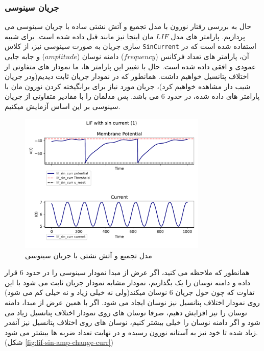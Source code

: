 \documentclass{article}
\begin{document}
            \subsubsection{جریان سینوسی}
                حال به بررسی رفتار نورون با مدل تجمیع و آتش نشتی ساده با جریان سینوسی می پردازیم. پارامتر های مدل 
                $LIF$
                مان اینجا نیز مانند قبل داده شده است.
                برای شبیه سازی جریان به صورت سینوسی نیز، از کلاس 
                \texttt{SinCurrent} 
                استفاده شده است که در آن، پارامتر های تعداد فرکانس
                ($frequency$) 
                دامنه نوسان
                ($amplitude$)
                و جابه جایی عمودی و افقی داده شده است. حال با تغییر این پارامتر ها، ما نمودار های متفاوتی از اختلاف پتانسیل خواهیم داشت. همانطور که در نمودار جریان ثابت دیدیم(ودر جریان شیب دار مشاهده خواهیم کرد)، جریان مورد نیاز برای برانگیخته کردن نورون مان با پارامتر های داده شده، در حدود 
                $6$ 
                می باشد. پس مدلمان را با مقادیر متفاوتی از جریان سینوسی بر این اساس آزمایش میکنیم.
                \begin{figure}[H]
                    \centering
                    \includegraphics[width=0.8\textwidth]{plots/LIF with sin current (1).pdf} 
                    \caption{مدل تجمیع و آتش نشتی با جریان سینوسی}
                    \label{fig:lif-sin-curr}
                \end{figure}
                همانطور که ملاحظه می کنید، اگر عرض از مبدا نمودار سینوسی را در حدود 
                $6$ 
                قرار داده و دامنه نوسان را یک بگذاریم، نمودار مشابه نمودار جریان ثابت می شود با این تفاوت که چون حول جریان 
                $6$ 
                نوسان میکند(ولی نه خیلی زیاد و نه خیلی کم می شود)
                روی نمودار اختلاف پتانسیل نیز نوسان ایجاد می شود.
                اگر با همین عرض از مبدا، دامنه نوسان را نیز افزایش دهیم، صرفا نوسان های روی نمودار اختلاف پتانسیل زیاد می شود و اگر دامنه نوسان را خیلی بیشتر کنیم، نوسان های روی اختلاف پتانسیل نیز آنقدر زیاد شده تا خود نیز به آستانه نورون رسیده و در نهایت تعداد ضربه ها بیشتر می شود.
                (شکل \ref{fig:lif-sin-amp-change-curr})
\end{document}
